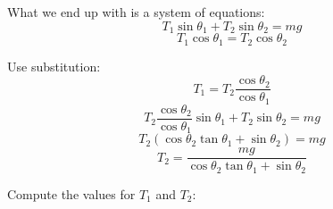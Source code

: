 \documentclass[12pt]{report}
\begin{document}
 \hfill {}

\vspace{.5cm}

\parbox[t]{9cm}{What we end up with is a system of equations: \vspace{1cm} $$T_1\sin{\theta_1} + T_2 \sin{\theta_2} = mg$$  $$T_1 \cos\theta_1 = T_2 \cos\theta_2$$} \hspace{1cm} \parbox[t]{6cm}{\centering Use substitution: $$T_1   = T_2 \frac{\cos\theta_2}{\cos\theta_1}$$ $$T_2 \frac{\cos\theta_2}{\cos\theta_1} \sin{\theta_1} + T_2 \sin\theta_2 = mg$$ \vspace{.2cm} $$T_2(\cos\theta_2 \tan\theta_1 + \sin{\theta_2}) = mg$$ \vspace{.1cm} $$T_2 = \frac{mg}{\cos\theta_2 \tan\theta_1 + \sin{\theta_2}}$$} \hfill

\vspace{1cm}

\parbox[t]{6cm}{Compute the values for $T_1$ and $T_2$:} 
\end{document}
